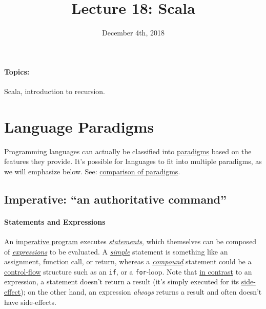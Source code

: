 \documentclass[12pt,letterpaper,twoside]{article}
\begin{document}
\title{Lecture 18: Scala\vspace{-5ex}}
\date{December 4th, 2018}
\maketitle

{\footnotesize
\paragraph{Topics:} Scala, introduction to recursion.
}
\vspace{-3ex}

\section{Language Paradigms}
Programming languages can actually be classified into 
\href{https://en.wikipedia.org/wiki/Programming_paradigm}{paradigms} 
based on the features they provide. It's possible for languages to fit into
multiple paradigms, as we will emphasize below. See: 
\href{https://en.wikipedia.org/wiki/Comparison_of_programming_paradigms}
{comparison of paradigms}.

\subsection{Imperative: {\small ``an authoritative command''}}

\paragraph{Statements and Expressions}
An \href{https://en.wikipedia.org/wiki/Imperative_programming}{imperative program} 
executes 
\href{https://en.wikipedia.org/wiki/Statement_(computer_science)}{\emph{statements}},
which themselves can be composed of
\href{https://en.wikipedia.org/wiki/Expression_(computer_science)}{\emph{expressions}}
to be evaluated. A 
\href{https://en.wikipedia.org/wiki/Statement_(computer_science)#Simple_statements}
{\emph{simple}} statement is something like an assignment, function call, or return,
whereas a 
\href{https://en.wikipedia.org/wiki/Statement_(computer_science)#Compound_statements}
{\emph{compound}} statement could be a 
\href{https://en.wikipedia.org/wiki/Control_flow}{control-flow} 
structure such as an \texttt{if},
or a \texttt{for}-loop. Note that \href{https://en.wikipedia.org/wiki/Statement_(computer_science)#Expressions}{in contrast}  to an expression, a statement doesn't return a result
(it's simply executed for its 
\href{https://en.wikipedia.org/wiki/Side_effect_(computer_science)}{side-effect});
on the other hand, an expression \emph{always} returns a result and often doesn't
have side-effects.
\end{document}
